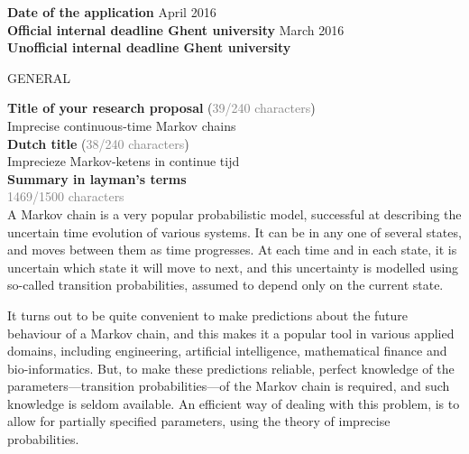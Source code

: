 \documentclass[11pt,dvipsnames,usenames,a4paper]{article}
\begin{document}
\newcommand{\todo}[1]{\textcolor{red}{\emph{#1}}}


{\bf Date of the application} \tab{} April 2016 \\
{\bf Official internal deadline Ghent university}  March 2016 \\
{\bf Unofficial internal deadline Ghent university}  \\


\begin{shaded}\centering GENERAL \end{shaded}
\textbf{Title of your research proposal} (\textcolor{Gray}{39/240 characters})\\
Imprecise continuous-time Markov chains\\[8pt]
\textbf{Dutch title} (\textcolor{Gray}{38/240 characters})\\
Imprecieze Markov-ketens in continue tijd\\[8pt]
\textbf{Summary in layman's terms}\\
\textcolor{Gray}{1469/1500 characters}\\
A Markov chain is a very popular probabilistic model, successful at describing the uncertain time evolution of various systems. 
It can be in any one of several states, and moves between them as time progresses. 
At each time and in each state, it is uncertain which state it will move to next, and this uncertainty is modelled using so-called transition probabilities, assumed to depend only on the current state. 

It turns out to be quite convenient to make predictions about the future behaviour of a Markov chain, and this makes it a popular tool in various applied domains, including engineering, artificial intelligence, mathematical finance and bio-informatics. 
But, to make these predictions reliable, perfect knowledge of the parameters---transition probabilities---of the Markov chain is required, and such knowledge is seldom available. 
An efficient way of dealing with this problem, is to allow for partially specified parameters, using the theory of imprecise probabilities.
\end{document}
